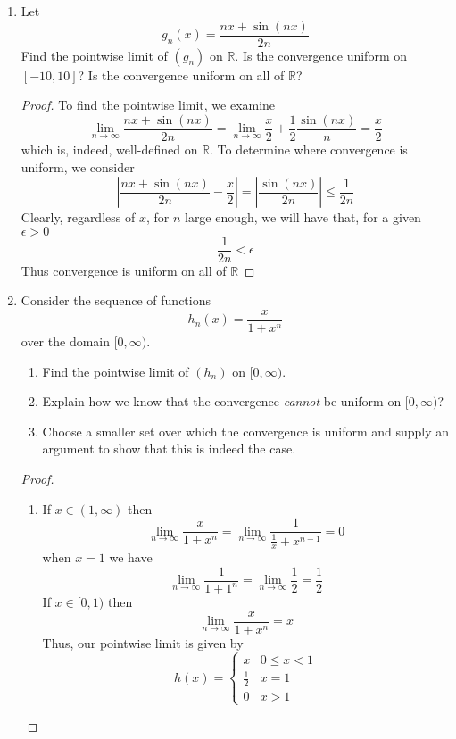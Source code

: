 \begin{enumerate}
    \item Let
    \[
    g_n(x) = \frac{nx+ \sin(nx)}{2n}
    \]
    Find the pointwise limit of \( (g_n) \) on \( \mathbb{R} \). Is the convergence uniform on \( [-10,10] \)? Is the convergence uniform on all of \( \mathbb{R} \)?
    
    \begin{proof}
    To find the pointwise limit, we examine
    \[
    \lim_{n \rightarrow \infty} \frac{nx+ \sin(nx)}{2n} = \lim_{n \rightarrow \infty} \frac{x}{2} + \frac{1}{2} \frac{\sin(nx)}{n} = \frac{x}{2}
    \]
    which is, indeed, well-defined on \( \mathbb{R} \). To determine where convergence is uniform, we consider
    \[
        \left| \frac{nx+\sin(nx)}{2n} - \frac{x}{2} \right| = \left| \frac{\sin(nx)}{2n} \right| \leq \frac{1}{2n} 
    \]
    Clearly, regardless of \( x \), for \( n \) large enough, we will have that, for a given \( \epsilon > 0 \)
    \[
    \frac{1}{2n} < \epsilon
    \]
    Thus convergence is uniform on all of \( \mathbb{R} \)
    \end{proof}
    
    \item Consider the sequence of functions
    \[
    h_n(x) = \frac{x}{1+x^n}
    \]
    over the domain \( [0, \infty) \).
    \begin{enumerate}
        \item Find the pointwise limit of \( (h_n) \) on \( [0,\infty) \).
        \item Explain how we know that the convergence \emph{cannot} be uniform on \( [0,\infty) \)?
        \item Choose a smaller set over which the convergence is uniform and supply an argument to show that this is indeed the case.
    \end{enumerate}
    
    \begin{proof}
    \begin{enumerate}
        \item If \( x \in (1, \infty) \) then
        \[
        \lim_{n \rightarrow \infty} \frac{x}{1+x^n} = \lim_{n \rightarrow \infty} \frac{1}{\frac{1}{x}+ x^{n-1}} = 0
        \]
        when \( x=1 \) we have
        \[
        \lim_{n \rightarrow \infty} \frac{1}{1+1^n} = \lim_{n \rightarrow \infty} \frac{1}{2} = \frac{1}{2}
        \]
        If \( x \in [0,1) \) then
        \[
        \lim_{n\rightarrow \infty} \frac{x}{1+x^n} = x
        \]
        Thus, our pointwise limit is given by
        \[
        h(x) = \begin{cases} x & 0 \leq x < 1 \\ \frac{1}{2} & x = 1 \\ 0 & x > 1 \end{cases}
        \]
        

\end{enumerate}
\end{proof}
\end{enumerate}
